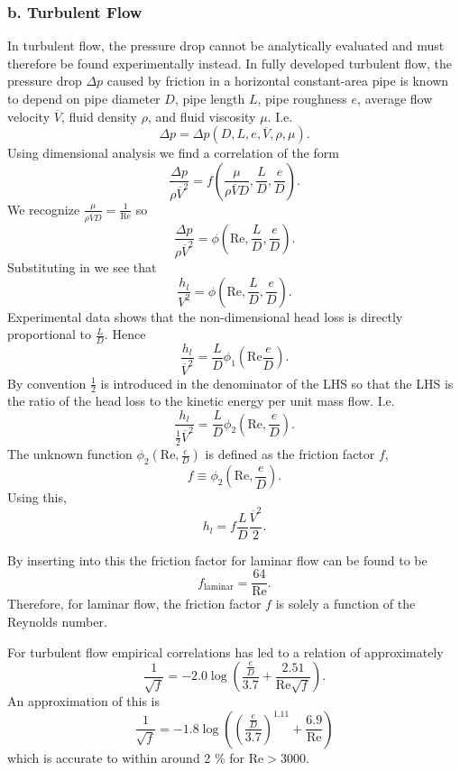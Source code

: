 \subsubsection{b. Turbulent Flow}
In turbulent flow, the pressure drop cannot be analytically evaluated and must therefore be found experimentally instead.
In fully developed turbulent flow, the pressure drop $\Delta p$ caused by friction in a horizontal constant-area pipe is known to depend on pipe diameter $D$, pipe length $L$, pipe roughness $e$, average flow velocity $\overline{V}$, fluid density $\rho$, and fluid viscosity $\mu$.
I.e.
\[ 
\Delta p = \Delta p \left( D, L, e, \overline{V}, \rho, \mu \right)
.\]
Using dimensional analysis we find a correlation of the form
\[ 
\frac{\Delta p}{\rho \overline{V}^2} = f \left( \frac{\mu}{\rho \overline{V} D}, \frac{L}{D}, \frac{e}{D} \right)
.\]
We recognize $\frac{\mu}{\rho \overline{V} D} = \frac{1}{\mathrm{Re}}$ so
\[ 
  \frac{\Delta p}{\rho \overline{V}^2} = \phi \left( \mathrm{Re}, \frac{L}{D}, \frac{e}{D} \right)
.\]
Substituting in  we see that
\[ 
\frac{h_l}{V^2} = \phi \left( \mathrm{Re}, \frac{L}{D}, \frac{e}{D} \right)
.\]
Experimental data shows that the non-dimensional head loss is directly proportional to $\frac{L}{D}$.
Hence
\[ 
\frac{h_l}{\overline{V}^2} = \frac{L}{D} \phi_1 \left( \mathrm{Re} \frac{e}{D} \right)
.\]
By convention $\frac{1}{2}$ is introduced in the denominator of the LHS so that the LHS is the ratio of the head loss to the kinetic energy per unit mass flow.
I.e.
\[ 
\frac{h_l}{\frac{1}{2} \overline{V}^2} = \frac{L}{D} \phi_2 \left( \mathrm{Re}, \frac{e}{D} \right)
.\]
The unknown function $\phi_2 \left( \mathrm{Re}, \frac{e}{D} \right)$ is defined as the friction factor $f$,
\[ 
f \equiv \phi_2 \left( \mathrm{Re}, \frac{e}{D} \right)
.\]
Using this,
\[ 
h_l = f \frac{L}{D} \frac{\overline{V}^2}{2}
.\]

By inserting  into this the friction factor for laminar flow can be found to be
\[ 
f_{\text{laminar}} = \frac{64}{\mathrm{Re}}
.\]
Therefore, for laminar flow, the friction factor $f$ is solely a function of the Reynolds number.

For turbulent flow empirical correlations has led to a relation of approximately
\[ 
\frac{1}{\sqrt{f}} = - \num{2,0} \log \left( \frac{\frac{e}{D}}{\num{3,7} } + \frac{\num{2,51} }{\mathrm{Re} \sqrt{f}} \right)
.\]
An approximation of this is
\[ 
\frac{1}{\sqrt{f}} = \num{-1,8}  \log \left( \left( \frac{\frac{e}{D}}{\num{3,7} } \right)^{\num{1,11} } + \frac{\num{6,9} }{\mathrm{Re}} \right)
\]
which is accurate to within around 2 \% for $\mathrm{Re} > \num{3000}$.

